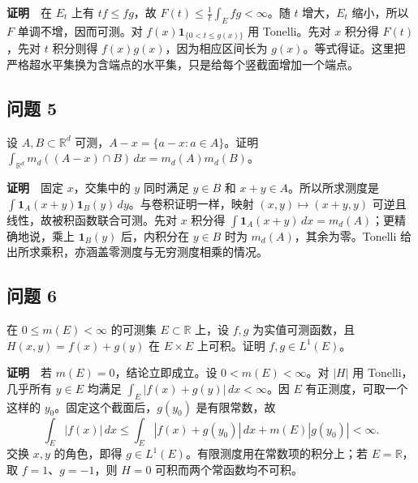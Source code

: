 \documentclass[11pt,a4paper]{article}
\begin{document}
\textbf{证明}　在 \(E_t\) 上有 \(tf\le fg\)，故
\(F(t)\le\frac1t\int_E fg<\infty\)。随 \(t\) 增大，\(E_t\) 缩小，所以
\(F\) 单调不增，因而可测。对 \(f(x)\mathbf1_{\{0<t\le g(x)\}}\) 用
Tonelli。先对 \(x\) 积分得 \(F(t)\)，先对 \(t\) 积分则得
\(f(x)g(x)\)，因为相应区间长为
\(g(x)\)。等式得证。这里把严格超水平集换为含端点的水平集，只是给每个竖截面增加一个端点。

\subsection{问题 5}\label{ux95eeux9898-5}

设 \(A,B\subset\mathbb R^d\) 可测，\(A-x=\{a-x:a\in A\}\)。证明
\(\int_{\mathbb R^d}m_d((A-x)\cap B)\,dx=m_d(A)m_d(B)\)。

\textbf{证明}　固定 \(x\)，交集中的 \(y\) 同时满足 \(y\in B\) 和
\(x+y\in A\)。所以所求测度是
\(\int\mathbf1_A(x+y)\mathbf1_B(y)\,dy\)。与卷积证明一样，映射
\((x,y)\mapsto(x+y,y)\) 可逆且线性，故被积函数联合可测。先对 \(x\)
积分得 \(\int\mathbf1_A(x+y)\,dx=m_d(A)\)；更精确地说，乘上
\(\mathbf1_B(y)\) 后，内积分在 \(y\in B\) 时为
\(m_d(A)\)，其余为零。Tonelli
给出所求乘积，亦涵盖零测度与无穷测度相乘的情况。

\subsection{问题 6}\label{ux95eeux9898-6}

在 \(0\le m(E)<\infty\) 的可测集 \(E\subset\mathbb R\) 上，设 \(f,g\)
为实值可测函数，且 \(H(x,y)=f(x)+g(y)\) 在 \(E\times E\) 上可积。证明
\(f,g\in L^1(E)\)。

\textbf{证明}　若 \(m(E)=0\)，结论立即成立。设 \(0<m(E)<\infty\)。对
\(|H|\) 用 Tonelli，几乎所有 \(y\in E\) 均满足
\(\int_E|f(x)+g(y)|\,dx<\infty\)。因 \(E\) 有正测度，可取一个这样的
\(y_0\)。固定这个截面后，\(g(y_0)\) 是有限常数，故 \begin{equation*}
\int_E|f(x)|\,dx
\le \int_E|f(x)+g(y_0)|\,dx+m(E)|g(y_0)|<\infty .
\end{equation*} 交换 \(x,y\) 的角色，即得
\(g\in L^1(E)\)。有限测度用在常数项的积分上；若 \(E=\mathbb R\)，取
\(f=1\)、\(g=-1\)，则 \(H=0\) 可积而两个常函数均不可积。
\end{document}
